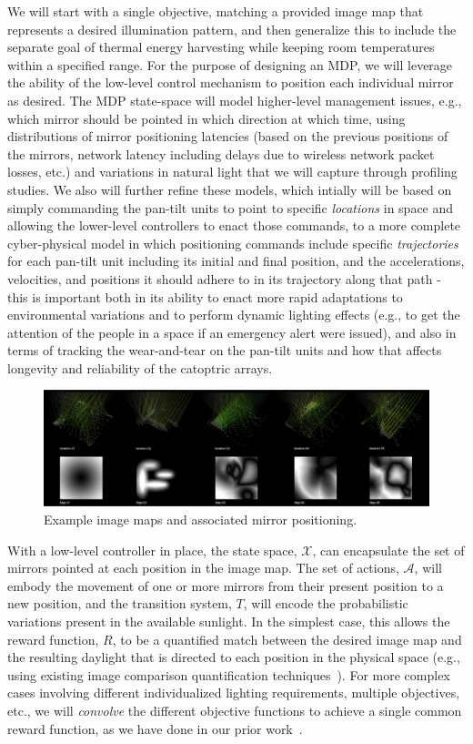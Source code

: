 We will start with a single objective, matching a provided image map that represents a 
desired illumination pattern, and then generalize this to include the separate goal of 
thermal energy harvesting while keeping room temperatures within a specified range.
For the purpose of designing an MDP, we will leverage the ability of the low-level
control mechanism to position each individual mirror as desired.  The MDP state-space 
will model higher-level management issues, e.g., which mirror should be pointed in which 
direction at which time, using distributions of mirror positioning latencies (based on 
the previous positions of the mirrors, network latency including delays due to wireless
network packet losses, etc.) and variations in natural light that we will capture through 
profiling studies.  We also will further refine these models, which intially will be based
on simply commanding the pan-tilt units to point to specific \emph{locations} in space and 
allowing the lower-level controllers to enact those commands, to a more complete cyber-physical
model in which positioning commands include specific \emph{trajectories} for each pan-tilt 
unit including its initial and final position, and the accelerations, velocities, and positions
it should adhere to in its trajectory along that path - this is important both in its
ability to enact more rapid adaptations to environmental variations and to perform dynamic
lighting effects (e.g., to get the attention of the people in a space if an emergency
alert were issued), and also in terms of tracking the wear-and-tear on the pan-tilt units and 
how that affects longevity and reliability of the catoptric arrays.

\begin{figure}[ht]
\centering
\includegraphics[width=0.9\linewidth]{figures/maps}
\caption{Example image maps and associated mirror positioning.}
\label{fig:maps}
\end{figure}

With a low-level controller in place, the state space, $\mathcal{X}$,
can encapsulate the set of mirrors pointed at each position in
the image map.  The set of actions, $\mathcal{A}$, will embody the movement
of one or more mirrors from their present position to a new position,
and the transition system, $T$, will encode the probabilistic variations
present in the available sunlight.  In the simplest case, this allows the 
reward function, $R$, to be a quantified match between the desired image 
map and the resulting daylight that is directed to each position in the physical space
(e.g., using existing image comparison quantification techniques~\cite{ds99,my09,wbo97}).
For more complex cases involving different individualized lighting requirements,
multiple objectives, etc., we will \emph{convolve} the different objective
functions to achieve a single common reward function, as we have done
in our prior work~\cite{tblwgs11,tggs10}.

